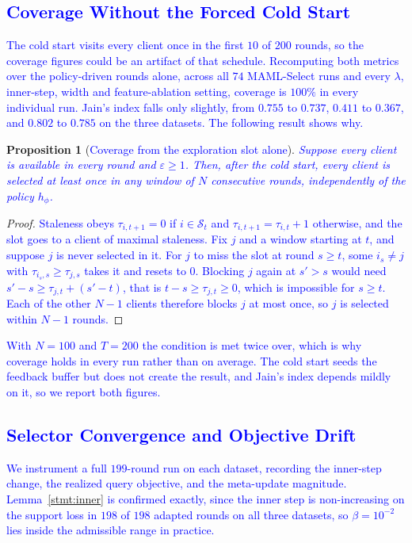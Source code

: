 \documentclass[journal]{IEEEtran}
\newtheorem{proposition}{Proposition}
\theoremstyle{remark}
\newcommand{\revtwo}[1]{\textcolor{blue}{#1}}
\begin{document}
\subsection{\revtwo{Coverage Without the Forced Cold Start}}\label{sec:fairness_recheck}
\revtwo{The cold start visits every client once in the first $10$ of $200$ rounds, so the coverage figures could be an artifact of that schedule. Recomputing both metrics over the policy-driven rounds alone, across all $74$ MAML-Select runs and every $\lambda$, inner-step, width and feature-ablation setting, coverage is $100\%$ in every individual run. Jain's index falls only slightly, from $0.755$ to $0.737$, $0.411$ to $0.367$, and $0.802$ to $0.785$ on the three datasets. The following result shows why.}

\begin{proposition}[\revtwo{Coverage from the exploration slot alone}]\label{prop:coverage}
\revtwo{Suppose every client is available in every round and $\varepsilon\ge 1$. Then, after the cold start, every client is selected at least once in any window of $N$ consecutive rounds, independently of the policy $h_\phi$.}
\end{proposition}
\begin{proof}
\revtwo{Staleness obeys $\tau_{i,t+1}=0$ if $i\in\mathcal{S}_t$ and $\tau_{i,t+1}=\tau_{i,t}+1$ otherwise, and the slot goes to a client of maximal staleness. Fix $j$ and a window starting at $t$, and suppose $j$ is never selected in it. For $j$ to miss the slot at round $s\ge t$, some $i_s\neq j$ with $\tau_{i_s,s}\ge\tau_{j,s}$ takes it and resets to $0$. Blocking $j$ again at $s'>s$ would need $s'-s\ge\tau_{j,t}+(s'-t)$, that is $t-s\ge\tau_{j,t}\ge 0$, which is impossible for $s\ge t$. Each of the other $N-1$ clients therefore blocks $j$ at most once, so $j$ is selected within $N-1$ rounds.}
\end{proof}
\revtwo{With $N=100$ and $T=200$ the condition is met twice over, which is why coverage holds in every run rather than on average. The cold start seeds the feedback buffer but does not create the result, and Jain's index depends mildly on it, so we report both figures.}

\subsection{\revtwo{Selector Convergence and Objective Drift}}\label{sec:selector_convergence}
\revtwo{We instrument a full $199$-round run on each dataset, recording the inner-step change, the realized query objective, and the meta-update magnitude. Lemma~\ref{stmt:inner} is confirmed exactly, since the inner step is non-increasing on the support loss in $198$ of $198$ adapted rounds on all three datasets, so $\beta=10^{-2}$ lies inside the admissible range in practice.}
\end{document}

